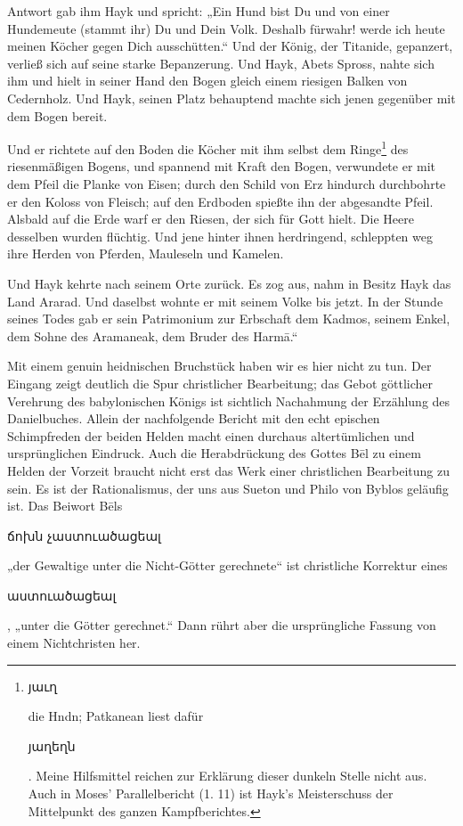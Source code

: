 \documentclass{article}
\begin{document}
Antwort gab ihm Hayk und spricht: „Ein Hund bist Du und von einer Hundemeute (stammt ihr) Du und Dein Volk. Deshalb fürwahr! werde ich heute meinen Köcher gegen Dich ausschütten.“ Und der König, der Titanide, gepanzert, verließ sich auf seine starke Bepanzerung. Und Hayk, Abets Spross, nahte sich ihm und hielt in seiner Hand den Bogen gleich einem riesigen Balken von Cedernholz. Und Hayk, seinen Platz behauptend machte sich jenen gegenüber mit dem Bogen bereit.

Und er richtete auf den Boden die Köcher mit ihm selbst dem Ringe\footnote{\begin{armenian}յաւղ\end{armenian} die Hndn; Patkanean liest dafür \begin{armenian}յաղեղն\end{armenian}. Meine Hilfsmittel reichen zur Erklärung dieser dunkeln Stelle nicht aus. Auch in Moses' Parallelbericht (1. 11) ist Hayk's Meisterschuss der Mittelpunkt des ganzen Kampfberichtes.} des riesenmäßigen Bogens, und spannend mit Kraft den Bogen, verwundete er mit dem Pfeil die Planke von Eisen; durch den Schild von Erz hindurch durchbohrte er den Koloss von Fleisch; auf den Erdboden spießte ihn der abgesandte Pfeil. Alsbald auf die Erde warf er den Riesen, der sich für Gott hielt. Die Heere desselben wurden flüchtig. Und jene hinter ihnen herdringend, schleppten weg ihre Herden von Pferden, Mauleseln und Kamelen.

Und Hayk kehrte nach seinem Orte zurück. Es zog aus, nahm in Besitz Hayk das Land Ararad. Und daselbst wohnte er mit seinem Volke bis jetzt. In der Stunde seines Todes gab er sein Patrimonium zur Erbschaft dem Kadmos, seinem Enkel, dem Sohne des Aramaneak, dem Bruder des Harmā.“

Mit einem genuin heidnischen Bruchstück haben wir es hier nicht zu tun. Der Eingang zeigt deutlich die Spur christlicher Bearbeitung; das Gebot göttlicher Verehrung des babylonischen Königs ist sichtlich Nachahmung der Erzählung des Danielbuches. Allein der nachfolgende Bericht mit den echt epischen Schimpfreden der beiden Helden macht einen durchaus altertümlichen und ursprünglichen Eindruck. Auch die Herabdrückung des Gottes Bēl zu einem Helden der Vorzeit braucht nicht erst das Werk einer christlichen Bearbeitung zu sein. Es ist der Rationalismus, der uns aus Sueton und Philo von Byblos geläufig ist. Das Beiwort Bēls \begin{armenian}ճոխն չաստուածացեալ\end{armenian} „der Gewaltige unter die Nicht-Götter gerechnete“ ist christliche Korrektur eines \begin{armenian}աստուածացեալ\end{armenian}, „unter die Götter gerechnet.“ Dann rührt aber die ursprüngliche Fassung von einem Nichtchristen her.
\end{document}
